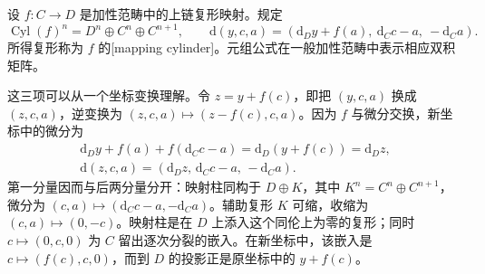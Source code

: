 \begin{definition}\label{b4:def:mapping-cylinder}
	设 \(f:C\to D\) 是加性范畴中的上链复形映射。规定
	\[
		\operatorname{Cyl}(f)^n=D^n\oplus C^n\oplus C^{n+1}, \qquad \mathrm{d}(y,c,a)=(\mathrm{d}_Dy+f(a),\ \mathrm{d}_Cc-a,\ -\mathrm{d}_Ca).
	\]
	所得复形称为 \(f\) 的[mapping cylinder]。元组公式在一般加性范畴中表示相应双积矩阵。
\end{definition}

这三项可以从一个坐标变换理解。令 \(z=y+f(c)\)，即把 \((y,c,a)\) 换成 \((z,c,a)\)，逆变换为 \((z,c,a)\mapsto(z-f(c),c,a)\)。因为 \(f\) 与微分交换，新坐标中的微分为
\[
	\begin{gathered}
		\mathrm{d}_Dy+f(a)+f(\mathrm{d}_Cc-a) =\mathrm{d}_D(y+f(c))=\mathrm{d}_Dz,\\
		\mathrm{d}(z,c,a)=(\mathrm{d}_Dz,\,\mathrm{d}_Cc-a,\,-\mathrm{d}_Ca).
	\end{gathered}
\]
第一分量因而与后两分量分开：映射柱同构于 \(D\oplus K\)，其中 \(K^n=C^n\oplus C^{n+1}\)，微分为 \((c,a)\mapsto(\mathrm{d}_Cc-a,-\mathrm{d}_Ca)\)。辅助复形 \(K\) 可缩，收缩为 \((c,a)\mapsto(0,-c)\)。映射柱是在 \(D\) 上添入这个同伦上为零的复形；同时 \(c\mapsto(0,c,0)\) 为 \(C\) 留出逐次分裂的嵌入。在新坐标中，该嵌入是 \(c\mapsto(f(c),c,0)\)，而到 \(D\) 的投影正是原坐标中的 \(y+f(c)\)。

